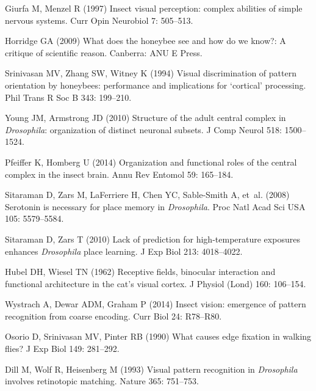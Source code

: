 \begin{thebibliography}{10}
	Giurfa M, Menzel R (1997) Insect visual perception: complex abilities of simple
	nervous systems.
	\newblock Curr Opin Neurobiol 7: 505--513.
	
	Horridge GA (2009) What does the honeybee see and how do we know?: A critique
	of scientific reason.
	\newblock Canberra: ANU E Press.
	
	Srinivasan MV, Zhang SW, Witney K (1994) Visual discrimination of pattern
	orientation by honeybees: performance and implications for `cortical'
	processing.
	\newblock Phil Trans R Soc B 343: 199--210.
	
	Young JM, Armstrong JD (2010) Structure of the adult central complex in
	\emph{Drosophila}: organization of distinct neuronal subsets.
	\newblock J Comp Neurol 518: 1500--1524.
	
	Pfeiffer K, Homberg U (2014) Organization and functional roles of the central
	complex in the insect brain.
	\newblock Annu Rev Entomol 59: 165--184.
	
	Sitaraman D, Zars M, LaFerriere H, Chen YC, Sable-Smith A, et~al. (2008)
	Serotonin is necessary for place memory in \emph{Drosophila}.
	\newblock Proc Natl Acad Sci USA 105: 5579--5584.
	
	Sitaraman D, Zars T (2010) Lack of prediction for high-temperature exposures
	enhances \emph{Drosophila} place learning.
	\newblock J Exp Biol 213: 4018--4022.
	
	Hubel DH, Wiesel TN (1962) Receptive fields, binocular interaction and
	functional architecture in the cat's visual cortex.
	\newblock J Physiol (Lond) 160: 106--154.
	
	Wystrach A, Dewar ADM, Graham P (2014) Insect vision: emergence of pattern
	recognition from coarse encoding.
	\newblock Curr Biol 24: R78--R80.
	
	Osorio D, Srinivasan MV, Pinter RB (1990) What causes edge fixation in walking
	flies?
	\newblock J Exp Biol 149: 281--292.
	
	Dill M, Wolf R, Heisenberg M (1993) Visual pattern recognition in
	\emph{Drosophila} involves retinotopic matching.
	\newblock Nature 365: 751--753.
	

\end{thebibliography}
